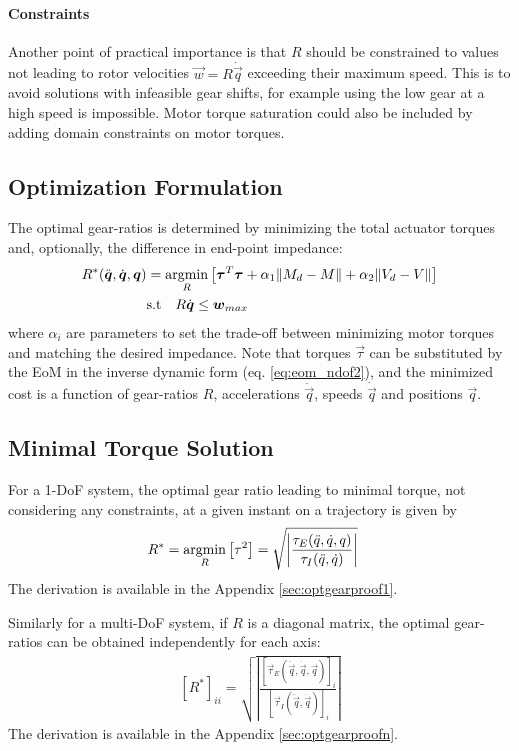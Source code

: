 \paragraph{Constraints}
Another point of practical importance is that $R$ should be constrained to values not leading to rotor velocities $\vec{w}=R \dot{\vec{q}}$ exceeding their maximum speed. This is to avoid solutions with infeasible gear shifts, for example using the low gear at a high speed is impossible. Motor torque saturation could also be included by adding domain constraints on motor torques.

\subsection{Optimization Formulation}
The optimal gear-ratios is determined by minimizing the total actuator torques and, optionally, the difference in end-point impedance:
%
\begin{align}
	R^{*}(\ddot{\vec{q}},\dot{\vec{q}},\vec{q}) &= \operatornamewithlimits{argmin}\limits_{R} \left[ \vec{\tau}^T \vec{\tau} + \alpha_1 \| M_{d} - M \| + \alpha_2 \| V_{d} - V \| \right]  \\
	& \text{s.t}  \quad R \dot{\vec{q}} \leq \vec{w}_{max} 
\label{eq:rmin_general}
\end{align}
%
where $\alpha_i$ are parameters to set the trade-off between minimizing motor torques and matching the desired impedance. Note that torques $\vec{\tau}$ can be substituted by the EoM in the inverse dynamic form (eq. \eqref{eq:eom_ndof2}), and the minimized cost is a function of gear-ratios $R$, accelerations $\ddot{\vec{q}}$, speeds $\dot{\vec{q}}$ and positions $\vec{q}$. 
%

\subsection{Minimal Torque Solution}

For a 1-DoF system, the optimal gear ratio leading to minimal torque, not considering any constraints, at a given instant on a trajectory is given by
%
\begin{align}
	R^{*} &= \operatornamewithlimits{argmin}\limits_{R} \left[ \tau^2 \right] = \sqrt{ \left | \frac{\tau_{E}(\ddot{q},\dot{q},q)}{\tau_{I}(\ddot{q},\dot{q})} \right |   } 
\label{eq:aaa}
\end{align}
%
The derivation is available in the Appendix \ref{sec:optgearproof1}.

Similarly for a multi-DoF system, if $R$ is a diagonal matrix, the optimal gear-ratios can be obtained independently for each axis:
%
\begin{align}
	[R^*]_{ii} = \sqrt{ \left | \frac{ [\vec{\tau}_{E}(\ddot{\vec{q}},\dot{\vec{q}},\vec{q})]_i }{ [\vec{\tau}_{I}(\ddot{\vec{q}},\dot{\vec{q}})]_i } \right | }
 \label{eq:rmin2}
\end{align}
%
The derivation is available in the Appendix \ref{sec:optgearproofn}.

